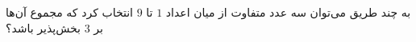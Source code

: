 \EXERCISE
به چند طریق می‌توان سه عدد متفاوت از میان اعداد
$1$
تا
$9$
انتخاب کرد که مجموع آن‌ها بر
$3$
بخش‌پذیر باشد؟